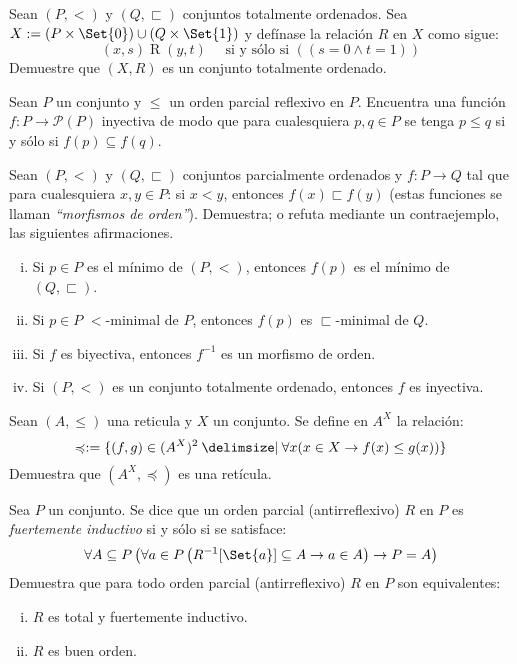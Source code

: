 \begin{exercise}[parzfc=2]
  Sean $(P,<)$ y $(Q,\sqsubset)$ conjuntos totalmente ordenados. Sea $X:=(P \times \Set{0}) \cup (Q \times \Set{1})$ y defínase la relación $R$ en $X$ como sigue:
  \[ (x,s) \mathrel{R} (y,t) \quad \text{ si y sólo si } \left( \left( s=0 \land t =1 \right) \right) \]
  Demuestre que $(X,R)$ es un conjunto totalmente ordenado.
\end{exercise}

\begin{exercise}[parzfc=2]
  Sean $P$ un conjunto y $\leq$ un orden parcial reflexivo en $P$. Encuentra una función $f:P \to \mathscr{P}(P)$ inyectiva de modo que para cualesquiera $p,q\in P$ se tenga $p \leq q$ si y sólo si $f(p) \subseteq f(q)$.
\end{exercise}

\begin{exercise}[parzfc=2, tezfc=2]
  Sean $(P,<)$ y $(Q,\sqsubset)$ conjuntos parcialmente ordenados y $f:P \to Q$ tal que para cualesquiera $x,y \in P$: si $x<y$, entonces $f(x) \sqsubset f(y)$ (estas funciones se llaman \textit{``morfismos de orden''}). Demuestra; o refuta mediante un contraejemplo, las siguientes afirmaciones.
  \begin{enumerate}[i)]
    \item Si $p \in P$ es el mínimo de $(P,<)$, entonces $f(p)$ es el mínimo de $(Q,\sqsubset)$.
    \item Si $p \in P$ $<$-minimal de $P$, entonces $f(p)$ es $\sqsubset$-minimal de $Q$.
    \item Si $f$ es biyectiva, entonces $f^{-1}$ es un morfismo de orden.
    \item Si $(P,<)$ es un conjunto totalmente ordenado, entonces $f$ es inyectiva.
  \end{enumerate}
\end{exercise}

\begin{exercise}[parzfc=2]
  Sean $(A,\leq)$ una reticula y $X$ un conjunto. Se define en $A^X$ la relación:
  \[\preccurlyeq :=\set{(f,g)\in (A^X)^2 \st \forall x(x\in X \rightarrow f(x)\leq g(x))}\]
  Demuestra que $(A^X,\preccurlyeq)$ es una retícula.
\end{exercise}

\begin{exercise}[parzfc=2, tezfc=2]
  Sea $P$ un conjunto. Se dice que un orden parcial (antirreflexivo) $R$ en $P$ es \textit{fuertemente inductivo} si y sólo si se satisface:
  \[ \forall A \subseteq P \left( \forall a \in P \left( R^{-1}[\Set{a}] \subseteq A \rightarrow a \in A \right) \rightarrow P = A \right) \]
  Demuestra que para todo orden parcial (antirreflexivo) $R$ en $P$ son equivalentes:
  \begin{enumerate}[i)]
    \item $R$ es total y fuertemente inductivo.
    \item $R$ es buen orden.
  \end{enumerate}
\end{exercise}
